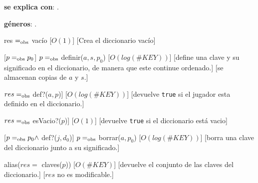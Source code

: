 \begin{Interfaz}
	\textbf{se explica con}: . 

	\textbf{géneros}: .


	{res $=_{\mathrm{obs}}$ vacío}
	[$O(1)$]
	[Crea el diccionario vacío]

	[$p =_{\mathrm{obs}} p_0$]
	{$p =_{\mathrm{obs}}$ definir($a, s, p_0$)}
	[$O(log(\#KEY))$]
	[define una clave y su significado en el diccionario, de manera que este continue ordenado.]
	[se almacenan copias de $a$ y $s$.]

	{$res =_{\mathrm{obs}}$ def?($a, p$)]}
	[$O(log(\#KEY))$]
	[devuelve \texttt{true} si el jugador esta definido en el diccionario.]

	{$res =_{\mathrm{obs}}$ esVacio?($p$)]}
	[$O(1)$]
	[devuelve \texttt{true} si el diccionario está vacio]

	[$p =_{\mathrm{obs}} p_0 \land$ def?($j, d_0$)]
	{$p =_{\mathrm{obs}}$ borrar($a, p_0$)}
	[$O(log(\#KEY))$]
	[borra una clave del diccionario junto a su significado.]

	{alias($res =$ claves($p$))}
	[$O(\#KEY)$]
	[devuelve el conjunto de las claves del diccionario.]
	[$res$ no es modificable.]




    



\end{Interfaz}


